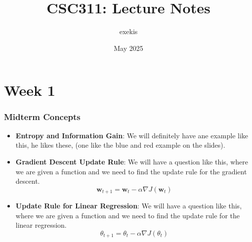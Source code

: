 \documentclass{article}
\title{CSC311: Lecture Notes}
\author{exekis}
\date{May 2025}
\begin{document}
\maketitle

\section*{Week 1}


\subsubsection*{Midterm Concepts}
\begin{itemize}
    \item \textbf{Entropy and Information Gain}: We will definitely have ane example like this, he likes these, (one like the blue and red example on the slides).
    \item \textbf{Gradient Descent Update Rule}: We will have a question like this, where we are given a function and we need to find the update rule for the gradient descent.
    \begin{equation}
        \mathbf{w}_{t+1} = \mathbf{w}_t - \alpha \nabla J(\mathbf{w}_t)
    \end{equation}
    \item \textbf{Update Rule for Linear Regression}: We will have a question like this, where we are given a function and we need to find the update rule for the linear regression.
    \begin{equation}
        \theta_{t+1} = \theta_t - \alpha \nabla J(\theta_t)
    \end{equation}
\end{itemize}
\end{document}
